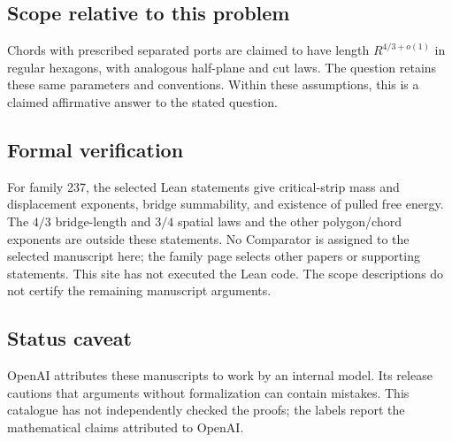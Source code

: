 \documentclass[11pt]{article}
\begin{document}
\subsection{Scope relative to this problem}
Chords with prescribed separated ports are claimed to have length $R^{4/3+o(1)}$ in regular hexagons, with analogous half-plane and cut laws. The question retains these same parameters and conventions. Within these assumptions, this is a claimed affirmative answer to the stated question.

\subsection{Formal verification}
For family 237, the selected Lean statements give critical-strip mass and displacement exponents, bridge summability, and existence of pulled free energy. The $4/3$ bridge-length and $3/4$ spatial laws and the other polygon/chord exponents are outside these statements. No Comparator is assigned to the selected manuscript here; the family page selects other papers or supporting statements. This site has not executed the Lean code. The scope descriptions do not certify the remaining manuscript arguments.

\subsection{Status caveat}
OpenAI attributes these manuscripts to work by an internal model. Its release cautions that arguments without formalization can contain mistakes. This catalogue has not independently checked the proofs; the labels report the mathematical claims attributed to OpenAI.
\end{document}
